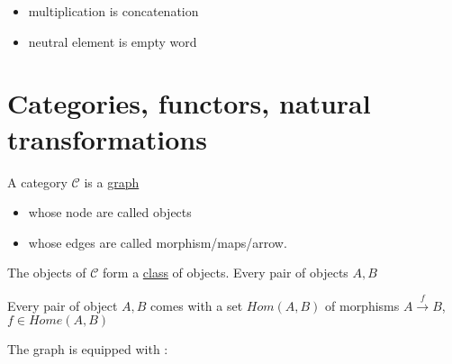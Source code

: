 \documentclass{article}
\theoremstyle{plain}
\begin{document}
  \begin{itemize}
    \item multiplication is concatenation
    \item neutral element is empty word
  \end{itemize}

  \section{Categories, functors, natural transformations}

   A category $\mathcal C$ is a \underline{graph}
    \begin{itemize}
      \item whose node are called objects
      \item whose edges are called morphism/maps/arrow.
    \end{itemize}

    The objects of $\mathcal C$ form a \underline{class} of objects.
    Every pair of objects $A, B$

    Every pair of object $A,B$ comes with a set $Hom(A, B)$ of morphisms
    $A \xrightarrow{f} B$, $f \in Home(A, B)$

    The graph is equipped with :
\end{document}
